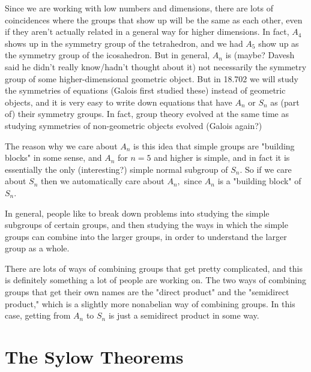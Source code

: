 \begin{ans}
Since we are working with low numbers and dimensions, there are lots of coincidences where the groups that show up will be the same as each other, even if they aren't actually related in a general way for higher dimensions. In fact, $A_4$ shows up in the symmetry group of the tetrahedron, and we had $A_5$ show up as the symmetry group of the icosahedron. But in general, $A_n$ is (maybe? Davesh said he didn't really know/hadn't thought about it) not necessarily the symmetry group of some higher-dimensional geometric object. But in 18.702 we will study the symmetries of equations (Galois first studied these) instead of geometric objects, and it is very easy to write down equations that have $A_n$ or $S_n$ as (part of) their symmetry groups. In fact, group theory evolved at the same time as studying symmetries of non-geometric objects evolved (Galois again?) 

The reason why we care about $A_n$ is this idea that simple groups are "building blocks" in some sense, and $A_n$ for $n = 5$ and higher is simple, and in fact it is essentially the only (interesting?) simple normal subgroup of $S_n.$ So if we care about $S_n$ then we automatically care about $A_n,$ since $A_n$ is a "building block" of $S_n.$ 

In general, people like to break down problems into studying the simple subgroups of certain groups, and then studying the ways in which the simple groups can combine into the larger groups, in order to understand the larger group as a whole.

There are lots of ways of combining groups that get pretty complicated, and this is definitely something a lot of people are working on. The two ways of combining groups that get their own names are the "direct product" and the "semidirect product," which is a slightly more nonabelian way of combining groups. In this case, getting from $A_n$ to $S_n$ is just a semidirect product in some way.
\end{ans}

\newpage


\section{The Sylow Theorems}

